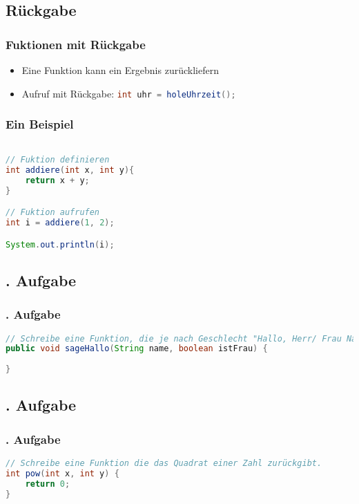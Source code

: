 \documentclass{beamer}
\begin{document}
\subsection{R\"uckgabe}
\begin{frame}[fragile]
	\frametitle{Fuktionen mit R\"uckgabe}
	\begin{itemize}
		\item Eine Funktion kann ein Ergebnis zur\"uckliefern
		\item Aufruf mit R\"uckgabe: \lstinline[language=java]{int uhr = holeUhrzeit();}
	\end{itemize}
\end{frame}

\begin{frame}[fragile]
	\frametitle{Ein Beispiel}
	\begin{lstlisting}[language=java]

// Fuktion definieren
int addiere(int x, int y){
	return x + y;	
}

// Fuktion aufrufen
int i = addiere(1, 2);

System.out.println(i);

	\end{lstlisting}
\end{frame}
\subsection{. Aufgabe}
\begin{frame}[fragile]
	\frametitle{. Aufgabe}
		
	\begin{lstlisting}[language=java]
// Schreibe eine Funktion, die je nach Geschlecht "Hallo, Herr/ Frau Name" und den Namen ausgibt.
public void sageHallo(String name, boolean istFrau) {
	
}
	\end{lstlisting}
\end{frame}
\subsection{. Aufgabe}
\begin{frame}[fragile]
	\frametitle{. Aufgabe}
	\begin{lstlisting}[language=java]
// Schreibe eine Funktion die das Quadrat einer Zahl zurückgibt.
int pow(int x, int y) {
	return 0;
}
	\end{lstlisting}
\end{frame}
\end{document}
